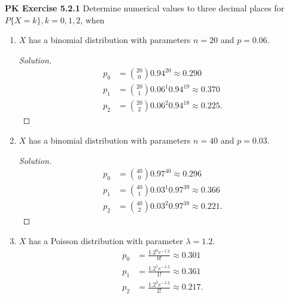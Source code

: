 \documentclass{article}
\begin{document}
\textbf{PK Exercise 5.2.1}
Determine numerical values to three decimal places for $P\{X = k\}, k = 0, 1, 2$, when
\begin{enumerate}[label=(\alph*)]
    \item $X$ has a binomial distribution with parameters $n = 20$ and $p = 0.06$.
    \begin{proof}[Solution]
        \begin{align*}
            p_0 & = {20\choose 0}0.94^{20} \approx 0.290 \\
            p_1 & = {20\choose 1}0.06^{1}0.94^{19} \approx 0.370 \\
            p_2 & = {20\choose 2}0.06^{2}0.94^{18} \approx 0.225.
        \end{align*}
    \end{proof}
    \item $X$ has a binomial distribution with parameters $n = 40$ and $p = 0.03$.
    \begin{proof}[Solution]
        \begin{align*}
            p_0 & = {40\choose 0}0.97^{40} \approx 0.296 \\
            p_1 & = {40\choose 1}0.03^{1}0.97^{39} \approx 0.366 \\
            p_2 & = {40\choose 2}0.03^{2}0.97^{38} \approx 0.221.
        \end{align*}
    \end{proof}
    \item $X$ has a Poisson distribution with parameter $\lambda = 1.2$.
    \begin{align*}
        p_0 & = \frac{1.2^0e^{-1.2}}{0!} \approx 0.301 \\
        p_1 & = \frac{1.2^1e^{-1.2}}{1!} \approx 0.361 \\
        p_2 & = \frac{1.2^2e^{-1.2}}{2!} \approx 0.217.
    \end{align*}
\end{enumerate}
\bigbreak
\end{document}
